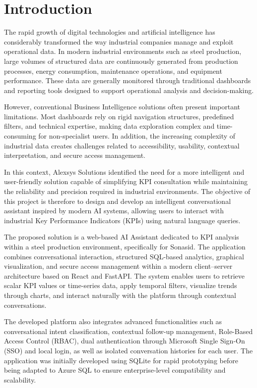 \documentclass[12pt,a4paper,openany]{report}
\begin{document}
\chapter{Introduction}

The rapid growth of digital technologies and artificial intelligence has considerably transformed the way industrial companies manage and exploit operational data. In modern industrial environments such as steel production, large volumes of structured data are continuously generated from production processes, energy consumption, maintenance operations, and equipment performance. These data are generally monitored through traditional dashboards and reporting tools designed to support operational analysis and decision-making.

However, conventional Business Intelligence solutions often present important limitations. Most dashboards rely on rigid navigation structures, predefined filters, and technical expertise, making data exploration complex and time-consuming for non-specialist users. In addition, the increasing complexity of industrial data creates challenges related to accessibility, usability, contextual interpretation, and secure access management.

In this context, Alexsys Solutions identified the need for a more intelligent and user-friendly solution capable of simplifying KPI consultation while maintaining the reliability and precision required in industrial environments. The objective of this project is therefore to design and develop an intelligent conversational assistant inspired by modern AI systems, allowing users to interact with industrial Key Performance Indicators (KPIs) using natural language queries.

The proposed solution is a web-based AI Assistant dedicated to KPI analysis within a steel production environment, specifically for Sonasid. The application combines conversational interaction, structured SQL-based analytics, graphical visualization, and secure access management within a modern client--server architecture based on React and FastAPI. The system enables users to retrieve scalar KPI values or time-series data, apply temporal filters, visualize trends through charts, and interact naturally with the platform through contextual conversations.

The developed platform also integrates advanced functionalities such as conversational intent classification, contextual follow-up management, Role-Based Access Control (RBAC), dual authentication through Microsoft Single Sign-On (SSO) and local login, as well as isolated conversation histories for each user. The application was initially developed using SQLite for rapid prototyping before being adapted to Azure SQL to ensure enterprise-level compatibility and scalability.
\end{document}
